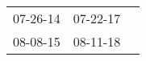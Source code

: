 \begin{supertabular}{lll}
 07-26-14\textsuperscript{} &  07-22-17\textsuperscript{} \\
 08-08-15\textsuperscript{} &  08-11-18\textsuperscript{} \\
\end{supertabular}
